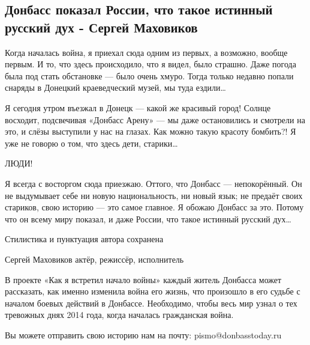  
 
 

\subsection{Донбасс показал России, что такое истинный русский дух - Сергей Маховиков}
\label{sec:06_11_2020.fb.andrei_zhernovoi.1.donbass_duh}

Когда началась война, я приехал сюда одним из первых, а возможно, вообще
первым. И то, что здесь происходило, что я видел, было страшно. Даже погода
была под стать обстановке --- было очень хмуро. Тогда только недавно попали
снаряды в Донецкий краеведческий музей, мы туда ездили…

Я сегодня утром въезжал в Донецк --- какой же красивый город! Солнце восходит,
подсвечивая «Донбасс Арену» --- мы даже остановились и смотрели на это, и слёзы
выступили у нас на глазах. Как можно такую красоту бомбить?! Я уже не говорю о
том, что здесь дети, старики…

ЛЮДИ!

Я всегда с восторгом сюда приезжаю. Оттого, что Донбасс --- непокорённый. Он не
выдумывает себе ни новую национальность, ни новый язык; не предаёт своих
стариков, свою историю --- это самое главное. Я обожаю Донбасс за это. Потому что
он всему миру показал, и даже России, что такое истинный русский дух…

Стилистика и пунктуация автора сохранена

Сергей Маховиков актёр, режиссёр, исполнитель

В проекте «Как я встретил начало войны» каждый житель Донбасса может
рассказать, как именно изменила война его жизнь, что произошло в его судьбе с
началом боевых действий в Донбассе. Необходимо, чтобы весь мир узнал о тех
тревожных днях 2014 года, когда началась гражданская война.

Вы можете отправить свою историю нам на почту: pismo@donbasstoday.ru

